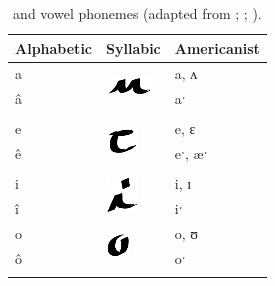 \documentclass[output=paper]{LSP/langsci}
\begin{document}
\begin{table}
\begin{tabular}{lll}
\lsptoprule
Alphabetic & Syllabic & Americanist\\
\midrule
a & \multirow{2}{*}{\includegraphics{figures/Danker2a}} & a, ʌ\\
â && aˑ\\ \\
e & \multirow{2}{*}{\includegraphics{figures/Danker2e}} & e, ɛ\\
ê && eˑ, æˑ\\ \\
i & \multirow{2}{*}{\includegraphics{figures/Danker2i}} & i, ɪ\\
î && iˑ\\
o & \multirow{2}{*}{\includegraphics{figures/Danker2o}} & o, ʊ\\
ô && oˑ\\
\lspbottomrule
\end{tabular}
\caption{ and  vowel phonemes (adapted from \citealt{NatLangMeskSauk}; \citealt{Susman1939}; \citealt{Jones1906}).}
\label{mesquakiesaukvowels}
\end{table}
\end{document}
